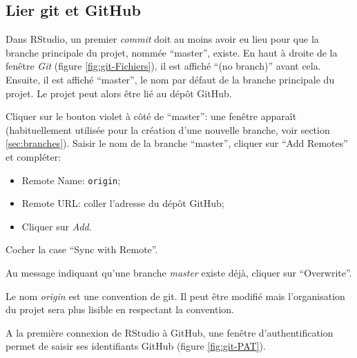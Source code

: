 \documentclass[
  11pt,
  french,
  a4paper,
  extrafontsizes,onecolumn,openright
  ]{memoir}
\providecommand{\tightlist}{%
  \setlength{\itemsep}{0pt}\setlength{\parskip}{0pt}}
\begin{document}
\hypertarget{lier-git-et-github}{%
\subsection{Lier git et GitHub}\label{lier-git-et-github}}

Dans RStudio, un premier \emph{commit} doit au moins avoir eu lieu pour que la branche principale du projet, nommée ``master'', existe.
En haut à droite de la fenêtre \emph{Git} (figure \ref{fig:git-Fichiers}), il est affiché ``(no branch)'' avant cela.
Ensuite, il est affiché ``master'', le nom par défaut de la branche principale du projet.
Le projet peut alors être lié au dépôt GitHub.

Cliquer sur le bouton violet à côté de ``master'': une fenêtre apparaît (habituellement utilisée pour la création d'une nouvelle branche, voir section \ref{sec:branches}).
Saisir le nom de la branche ``master'', cliquer sur ``Add Remotes'' et compléter:

\begin{itemize}
\tightlist
\item
  Remote Name: \texttt{origin};
\item
  Remote URL: coller l'adresse du dépôt GitHub;
\item
  Cliquer sur \emph{Add}.
\end{itemize}

Cocher la case ``Sync with Remote''.

Au message indiquant qu'une branche \emph{master} existe déjà, cliquer sur ``Overwrite''.

Le nom \emph{origin} est une convention de git.
Il peut être modifié mais l'organisation du projet sera plus lisible en respectant la convention.

A la première connexion de RStudio à GitHub, une fenêtre d'authentification permet de saisir ses identifiants GitHub (figure \ref{fig:git-PAT}).



\scriptsize
\end{document}

